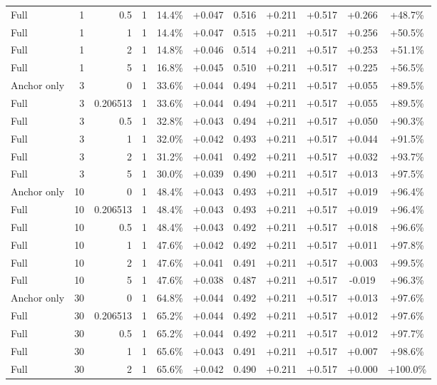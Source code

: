 \begin{table}[htbp]
\begin{tabular}{lrrrccccccc}
Full & 1 & 0.5 & 1 & 14.4\% & +0.047 & 0.516 & +0.211 & +0.517 & +0.266 & +48.7\% \\
Full & 1 & 1 & 1 & 14.4\% & +0.047 & 0.515 & +0.211 & +0.517 & +0.256 & +50.5\% \\
Full & 1 & 2 & 1 & 14.8\% & +0.046 & 0.514 & +0.211 & +0.517 & +0.253 & +51.1\% \\
Full & 1 & 5 & 1 & 16.8\% & +0.045 & 0.510 & +0.211 & +0.517 & +0.225 & +56.5\% \\
Anchor only & 3 & 0 & 1 & 33.6\% & +0.044 & 0.494 & +0.211 & +0.517 & +0.055 & +89.5\% \\
Full & 3 & 0.206513 & 1 & 33.6\% & +0.044 & 0.494 & +0.211 & +0.517 & +0.055 & +89.5\% \\
Full & 3 & 0.5 & 1 & 32.8\% & +0.043 & 0.494 & +0.211 & +0.517 & +0.050 & +90.3\% \\
Full & 3 & 1 & 1 & 32.0\% & +0.042 & 0.493 & +0.211 & +0.517 & +0.044 & +91.5\% \\
Full & 3 & 2 & 1 & 31.2\% & +0.041 & 0.492 & +0.211 & +0.517 & +0.032 & +93.7\% \\
Full & 3 & 5 & 1 & 30.0\% & +0.039 & 0.490 & +0.211 & +0.517 & +0.013 & +97.5\% \\
Anchor only & 10 & 0 & 1 & 48.4\% & +0.043 & 0.493 & +0.211 & +0.517 & +0.019 & +96.4\% \\
Full & 10 & 0.206513 & 1 & 48.4\% & +0.043 & 0.493 & +0.211 & +0.517 & +0.019 & +96.4\% \\
Full & 10 & 0.5 & 1 & 48.4\% & +0.043 & 0.492 & +0.211 & +0.517 & +0.018 & +96.6\% \\
Full & 10 & 1 & 1 & 47.6\% & +0.042 & 0.492 & +0.211 & +0.517 & +0.011 & +97.8\% \\
Full & 10 & 2 & 1 & 47.6\% & +0.041 & 0.491 & +0.211 & +0.517 & +0.003 & +99.5\% \\
Full & 10 & 5 & 1 & 47.6\% & +0.038 & 0.487 & +0.211 & +0.517 & -0.019 & +96.3\% \\
Anchor only & 30 & 0 & 1 & 64.8\% & +0.044 & 0.492 & +0.211 & +0.517 & +0.013 & +97.6\% \\
Full & 30 & 0.206513 & 1 & 65.2\% & +0.044 & 0.492 & +0.211 & +0.517 & +0.012 & +97.6\% \\
Full & 30 & 0.5 & 1 & 65.2\% & +0.044 & 0.492 & +0.211 & +0.517 & +0.012 & +97.7\% \\
Full & 30 & 1 & 1 & 65.6\% & +0.043 & 0.491 & +0.211 & +0.517 & +0.007 & +98.6\% \\
Full & 30 & 2 & 1 & 65.6\% & +0.042 & 0.490 & +0.211 & +0.517 & +0.000 & +100.0\% \\

\end{tabular}
\end{table}

